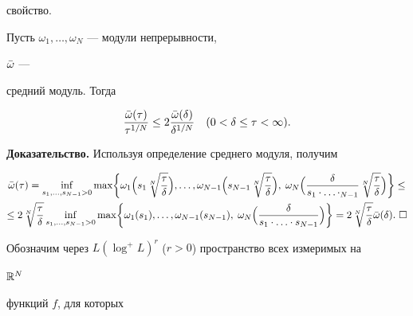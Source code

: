 свойство. 


 


\begin{lem} Пусть $\omega_1,\dotsc,\omega_N$ --- модули непрерывности, 


$\Bar\omega$ --- 


средний модуль. Тогда 


\begin{equation} 


\frac{\Bar\omega(\tau)}{\tau^{1/N}}\le 2\frac{\Bar\omega(\delta)}{\delta^{1/N}} 


\quad (0<\delta\le\tau<\infty). 


\end{equation} 


\end{lem} 


 


{\bf Доказательство.} Используя определение среднего модуля, получим 


\begin{gather*} 


\Bar\omega(\tau)=\inf_{s_1,\dotsc,s_{N-1}>0}\max\biggl\{ 


\omega_1\Bigl(s_1\sqrt[N]{\frac{\tau}{\delta}}\Bigr),\dotsc, 


\omega_{N-1}\Bigl(s_{N-1}\sqrt[N]{\frac{\tau}{\delta}}\Bigr),\; 


\omega_N\Bigl(\frac{\delta}{s_1\cdot\dotsc\cdot_{N-1}}


\sqrt[N]{\frac{\tau}{\delta}}\Bigr)\biggr\} \le \\ 


% 


\le 2\sqrt[N]{\frac{\tau}{\delta}}\inf_{s_1,\dotsc,s_{N-1}>0} 


\max\biggl\{\omega_1(s_1),\dotsc,\omega_{N-1}(s_{N-1}),\; 


\omega_N\Bigl(\frac{\delta}{s_1\cdot\dotsc\cdot s_{N-1}}\Bigr)\biggr\}= 


2\sqrt[N]{\frac{\tau}{\delta}}\Bar\omega(\delta). \ \square 


\end{gather*} 


 


Обозначим через $L(\log^+ L)^r$ ($r>0$) пространство всех измеримых на 


$\Bbb R^N$ 


функций $f$, для которых 


